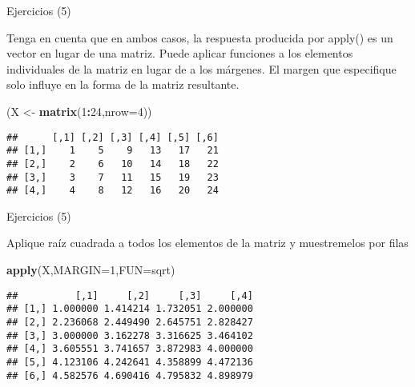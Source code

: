\documentclass[ignorenonframetext,]{beamer}
\newenvironment{Shaded}{\begin{snugshade}}{\end{snugshade}}
\newcommand{\KeywordTok}[1]{\textcolor[rgb]{0.13,0.29,0.53}{\textbf{#1}}}
\newcommand{\DataTypeTok}[1]{\textcolor[rgb]{0.13,0.29,0.53}{#1}}
\newcommand{\DecValTok}[1]{\textcolor[rgb]{0.00,0.00,0.81}{#1}}
\newcommand{\StringTok}[1]{\textcolor[rgb]{0.31,0.60,0.02}{#1}}
\newcommand{\OperatorTok}[1]{\textcolor[rgb]{0.81,0.36,0.00}{\textbf{#1}}}
\newcommand{\NormalTok}[1]{#1}
\begin{document}
\begin{frame}[fragile]{Ejercicios (5)}

Tenga en cuenta que en ambos casos, la respuesta producida por apply()
es un vector en lugar de una matriz. Puede aplicar funciones a los
elementos individuales de la matriz en lugar de a los márgenes. El
margen que especifique solo influye en la forma de la matriz resultante.

\begin{Shaded}
\begin{Highlighting}[]
\NormalTok{(X <-}\StringTok{ }\KeywordTok{matrix}\NormalTok{(}\DecValTok{1}\OperatorTok{:}\DecValTok{24}\NormalTok{,}\DataTypeTok{nrow=}\DecValTok{4}\NormalTok{))}
\end{Highlighting}
\end{Shaded}

\begin{verbatim}
##      [,1] [,2] [,3] [,4] [,5] [,6]
## [1,]    1    5    9   13   17   21
## [2,]    2    6   10   14   18   22
## [3,]    3    7   11   15   19   23
## [4,]    4    8   12   16   20   24
\end{verbatim}

\end{frame}

\begin{frame}[fragile]{Ejercicios (5)}

Aplique raíz cuadrada a todos los elementos de la matriz y muestremelos
por filas

\begin{Shaded}
\begin{Highlighting}[]
\KeywordTok{apply}\NormalTok{(X,}\DataTypeTok{MARGIN=}\DecValTok{1}\NormalTok{,}\DataTypeTok{FUN=}\NormalTok{sqrt)}
\end{Highlighting}
\end{Shaded}

\begin{verbatim}
##          [,1]     [,2]     [,3]     [,4]
## [1,] 1.000000 1.414214 1.732051 2.000000
## [2,] 2.236068 2.449490 2.645751 2.828427
## [3,] 3.000000 3.162278 3.316625 3.464102
## [4,] 3.605551 3.741657 3.872983 4.000000
## [5,] 4.123106 4.242641 4.358899 4.472136
## [6,] 4.582576 4.690416 4.795832 4.898979
\end{verbatim}

\end{frame}
\end{document}
